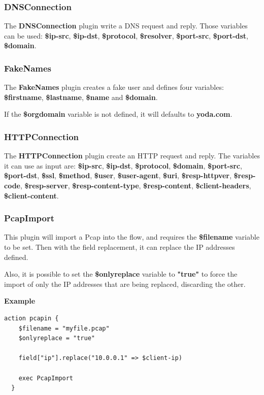 \documentclass[10pt]{article}
\begin{document}
\subsubsection{DNSConnection}

The \textbf{DNSConnection} plugin write a DNS request and reply. Those variables can be used: \textbf{\$ip-src}, \textbf{\$ip-dst}, \textbf{\$protocol}, \textbf{\$resolver}, \textbf{\$port-src}, \textbf{\$port-dst}, \textbf{\$domain}.

\subsubsection{FakeNames}

The \textbf{FakeNames} plugin creates a fake user and defines four variables: \textbf{\$firstname}, \textbf{\$lastname}, \textbf{\$name} and \textbf{\$domain}.

If the \textbf{\$orgdomain} variable is not defined, it will defaults to \textbf{yoda.com}.

\subsubsection{HTTPConnection}

The \textbf{HTTPConnection} plugin create an HTTP request and reply. The variables it can use as input are: \textbf{\$ip-src}, \textbf{\$ip-dst}, \textbf{\$protocol}, \textbf{\$domain}, \textbf{\$port-src}, \textbf{\$port-dst}, \textbf{\$ssl}, \textbf{\$method}, \textbf{\$user}, \textbf{\$user-agent}, \textbf{\$uri}, \textbf{\$resp-httpver}, \textbf{\$resp-code}, \textbf{\$resp-server}, \textbf{\$resp-content-type}, \textbf{\$resp-content}, \textbf{\$client-headers}, \textbf{\$client-content}.

\subsubsection{PcapImport}

This plugin will import a Pcap into the flow, and requires the \textbf{\$filename} variable to be set. Then with the field replacement, it can replace the IP addresses defined.

Also, it is possible to set the \textbf{\$onlyreplace} variable to \textbf{"true"} to force the import of only the IP addresses that are being replaced, discarding the other.

\textbf{Example}

\begin{lstlisting}[caption={Importing a Pcap file},captionpos=b]
  action pcapin {
    $filename = "myfile.pcap"
    $onlyreplace = "true"
    
    field["ip"].replace("10.0.0.1" => $client-ip)
    
    exec PcapImport
  }
\end{lstlisting}
\end{document}

